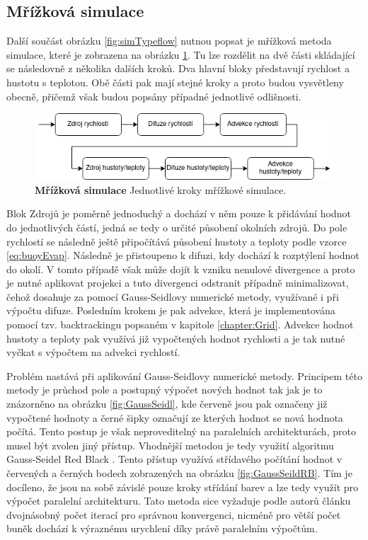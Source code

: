 \subsection{Mřížková simulace}
\label{chapter:simGrid}
Další součást obrázku \ref{fig:simTypeflow} nutnou popsat je mřížková metoda simulace, které je zobrazena na obrázku \ref{fig:Gridflow}. Tu lze rozdělit na dvě části skládající se následovně z několika dalších kroků. Dva hlavní bloky představují rychlost a hustotu s teplotou. Obě části pak mají stejné kroky a proto budou vysvětleny obecně, přičemž však budou popsány případné jednotlivé odlišnosti.

\begin{figure}[hbt]
	\centering
	\captionsetup{justification=centering}
	\includegraphics[scale=0.6]{obrazky-figures/GridFluid.png}
	\caption{\textbf{Mřížková simulace} Jednotlivé kroky mřížkové simulace.}
	\label{fig:Gridflow}
\end{figure}

Blok Zdrojů je poměrně jednoduchý a dochází v něm pouze k přidávání hodnot do jednotlivých částí, jedná se tedy o určité působení okolních zdrojů. Do pole rychlostí se následně ještě připočítává působení hustoty a teploty podle vzorce \ref{eq:buoyEvap}. Následně je přistoupeno k difuzi, kdy dochází k rozptýlení hodnot do okolí. V tomto případě však může dojít k vzniku nenulové divergence a proto je nutné aplikovat projekci a tuto divergenci odstranit případně minimalizovat, čehož dosahuje za pomocí Gauss-Seidlovy numerické metody, využívané i při výpočtu difuze. Posledním krokem je pak advekce, která je implementována pomocí tzv. backtrackingu popsaném v kapitole \ref{chapter:Grid}. Advekce hodnot hustoty a teploty pak využívá již vypočtených hodnot rychlosti a je tak nutné vyčkat s výpočtem na advekci rychlostí.

Problém nastává při aplikování Gauss-Seidlovy numerické metody. Principem této metody je průchod pole a postupný výpočet nových hodnot tak jak je to znázorněno na obrázku \ref{fig:GaussSeidl}, kde červeně jsou pak označeny již vypočtené hodnoty a černé šipky označují ze kterých hodnot se nová hodnota počítá. Tento postup je však neproveditelný na paralelních architekturách, proto musel být zvolen jiný přístup. Vhodnější metodou je tedy využití algoritmu Gauss-Seidel Red Black \cite{Amador2012LinearSF}. Tento přístup využívá střídavého počítání hodnot v červených a černých bodech zobrazených na obrázku \ref{fig:GaussSeildRB}. Tím je docíleno, že jsou na sobě závislé pouze kroky střídání barev a lze tedy využít pro výpočet paralelní architekturu. Tato metoda sice vyžaduje podle autorů článku \cite{Amador2012LinearSF} dvojnásobný počet iterací pro správnou konvergenci, nicméně pro větší počet buněk dochází k výraznému urychlení díky právě paralelním výpočtům.

